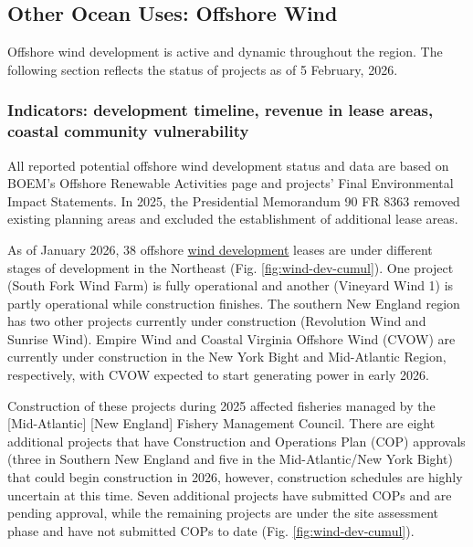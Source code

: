 \documentclass[
  10pt,
]{article}
\begin{document}
\subsection{Other Ocean Uses: Offshore
Wind}\label{other-ocean-uses-offshore-wind}

Offshore wind development is active and dynamic throughout the region.
The following section reflects the status of projects as of 5 February,
2026.

\subsubsection{Indicators: development timeline, revenue in lease areas,
coastal community
vulnerability}\label{indicators-development-timeline-revenue-in-lease-areas-coastal-community-vulnerability}

All reported potential offshore wind development status and data are
based on BOEM's Offshore Renewable Activities page and projects' Final
Environmental Impact Statements. In 2025, the Presidential Memorandum 90
FR 8363 removed existing planning areas and excluded the establishment
of additional lease areas.

As of January 2026, 38 offshore
\href{https://noaa-edab.github.io/catalog/wind_dev_speed.html}{wind
development} leases are under different stages of development in the
Northeast (Fig. \ref{fig:wind-dev-cumul}). One project (South Fork Wind
Farm) is fully operational and another (Vineyard Wind 1) is partly
operational while construction finishes. The southern New England region
has two other projects currently under construction (Revolution Wind and
Sunrise Wind). Empire Wind and Coastal Virginia Offshore Wind (CVOW) are
currently under construction in the New York Bight and Mid-Atlantic
Region, respectively, with CVOW expected to start generating power in
early 2026.

Construction of these projects during 2025 affected fisheries managed by
the {[}Mid-Atlantic{]} {[}New England{]} Fishery Management Council.
There are eight additional projects that have Construction and
Operations Plan (COP) approvals (three in Southern New England and five
in the Mid-Atlantic/New York Bight) that could begin construction in
2026, however, construction schedules are highly uncertain at this time.
Seven additional projects have submitted COPs and are pending approval,
while the remaining projects are under the site assessment phase and
have not submitted COPs to date (Fig. \ref{fig:wind-dev-cumul}).
\end{document}
